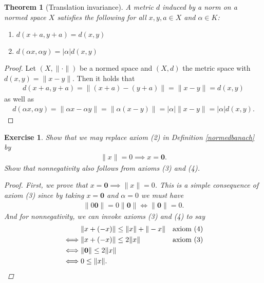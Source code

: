 \documentclass[11pt]{article}
\theoremstyle{mystyle}
\newtheorem{thm}{Theorem}[section]
\newtheorem{protoexer}{Exercise}[section]
\newenvironment{exer}
{\colorlet{shadecolor}{blue!15}\begin{shaded}\begin{protoexer}}
{\end{protoexer}\end{shaded}}
\newcommand{\0}{\mathbf{0}}
\begin{document}
\begin{thm}[Translation invariance]\label{translationinvariant}
A metric $d$ induced by a norm on a normed space $X$ satisfies the following for all $x, y, a\in X$ and $\alpha \in K$:
\begin{enumerate}
    \item $d(x + a, y + a) = d(x, y)$
    \item $d(\alpha x, \alpha y) = |\alpha| d(x, y)$
\end{enumerate}
\end{thm}
\begin{proof}
Let $(X, \| \cdot \|)$ be a normed space and $(X, d)$ the metric space with $d(x, y) = \| x - y\|$. Then it holds that
\begin{align*}
    d(x + a, y + a) = \| (x + a) - (y + a) \| = \| x - y\| = d(x, y)
\end{align*}
as well as
\begin{align*}
    d(\alpha x, \alpha y) = \| \alpha x - \alpha y\| = \| \alpha(x - y) \| = |\alpha| \| x - y\| = |\alpha| d(x,y).
\end{align*}
\end{proof}

\begin{exer}
Show that we may replace axiom (2) in Definition \ref{normedbanach} by 
\begin{align*}
    \| x \| = 0 \implies x = \0.
\end{align*}
Show that nonnegativity also follows from axioms (3) and (4).
\begin{proof}
First, we prove that $x = \0 \implies \|x\| = 0$. This is a simple consequence of axiom (3) since by taking $x = \0$ and $\alpha = 0$ we must have
\begin{align*}
    \|0\0\| = 0\|\0\| \iff \| \0\| = 0. 
\end{align*}
And for nonnegativity, we can invoke axioms (3) and (4) to say
\begin{align*}
    &\| x + (-x) \| \leq \| x \| + \| -x \| & \text{axiom (4)}\\
    \iff& \| x + (-x) \| \leq 2\|x \|  & \text{\text{axiom (3)}}\\
    \iff&\|\0\| \leq 2\|x\|\\
    \iff& 0 \leq \|x\|.
\end{align*}
\end{proof}
\end{exer}
\end{document}
